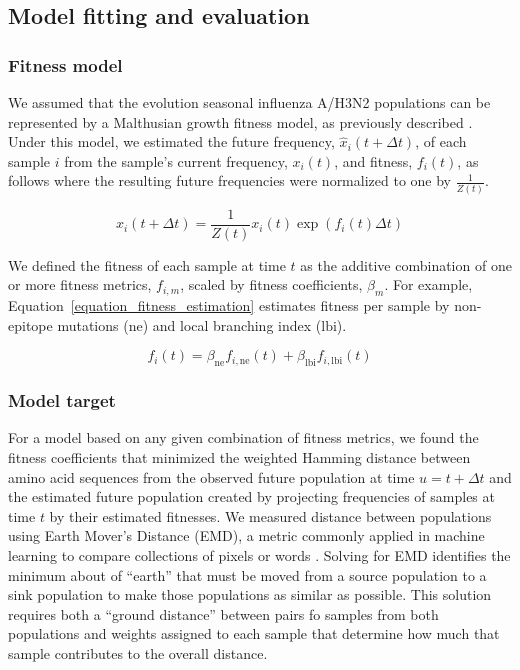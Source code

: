 \subsection*{Model fitting and evaluation}

\subsubsection*{Fitness model}

We assumed that the evolution seasonal influenza A/H3N2 populations can be represented by a Malthusian growth fitness model, as previously described \cite{Luksza:2014hj}.
Under this model, we estimated the future frequency, $\hat{x}_{i}(t + \Delta{t})$, of each sample $i$ from the sample's current frequency, $x_{i}(t)$, and fitness, $f_{i}(t)$, as follows where the resulting future frequencies were normalized to one by $\frac{1}{Z(t)}$.

\begin{equation}
    \hat{x}_{i}(t + \Delta{t}) = \frac{1}{Z(t)}x_{i}(t)\exp(f_{i}(t)\Delta{t})
    \label{equation_exponential_growth_model}
\end{equation}

We defined the fitness of each sample at time $t$ as the additive combination of one or more fitness metrics, $f_{i,m}$, scaled by fitness coefficients, $\beta_{m}$.
For example, Equation~\ref{equation_fitness_estimation} estimates fitness per sample by non-epitope mutations ($\mathrm{ne}$) and local branching index ($\mathrm{lbi}$).

\begin{equation}
    f_{i}(t) = \beta_{\mathrm{ne}}f_{i, \mathrm{ne}}(t) + \beta_{\mathrm{lbi}}f_{i, \mathrm{lbi}}(t)
    \label{equation_fitness_estimation}
\end{equation}

\subsubsection*{Model target}

For a model based on any given combination of fitness metrics, we found the fitness coefficients that minimized the weighted Hamming distance between amino acid sequences from the observed future population at time $u = t + \Delta{t}$ and the estimated future population created by projecting frequencies of samples at time $t$ by their estimated fitnesses.
We measured distance between populations using Earth Mover's Distance (EMD), a metric commonly applied in machine learning to compare collections of pixels or words \cite{Rubner1998,Kusner2015}.
Solving for EMD identifies the minimum about of ``earth'' that must be moved from a source population to a sink population to make those populations as similar as possible.
This solution requires both a ``ground distance'' between pairs fo samples from both populations and weights assigned to each sample that determine how much that sample contributes to the overall distance.

